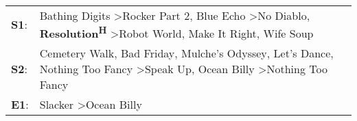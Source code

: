 \begin{supertabular}{p{0.03\textwidth}p{0.92\textwidth}}
 \textbf{S1}:  &  Bathing Digits\textsuperscript{} \textgreater \enspace Rocker Part 2\textsuperscript{}, \enspace Blue Echo\textsuperscript{} \textgreater \enspace No Diablo\textsuperscript{}, \enspace \textbf{Resolution\textsuperscript{H}} \textgreater \enspace Robot World\textsuperscript{}, \enspace Make It Right\textsuperscript{}, \enspace Wife Soup\textsuperscript{}  \enspace  \\
 \textbf{S2}:  &         Cemetery Walk\textsuperscript{}, \enspace Bad Friday\textsuperscript{}, \enspace Mulche's Odyssey\textsuperscript{}, \enspace Let's Dance\textsuperscript{}, \enspace Nothing Too Fancy\textsuperscript{} \textgreater \enspace Speak Up\textsuperscript{}, \enspace Ocean Billy\textsuperscript{} \textgreater \enspace Nothing Too Fancy\textsuperscript{}  \enspace  \\
 \textbf{E1}:  &                                                                                                                                                                                                                                                                                        Slacker\textsuperscript{} \textgreater \enspace Ocean Billy\textsuperscript{}  \enspace  \\
\end{supertabular}
